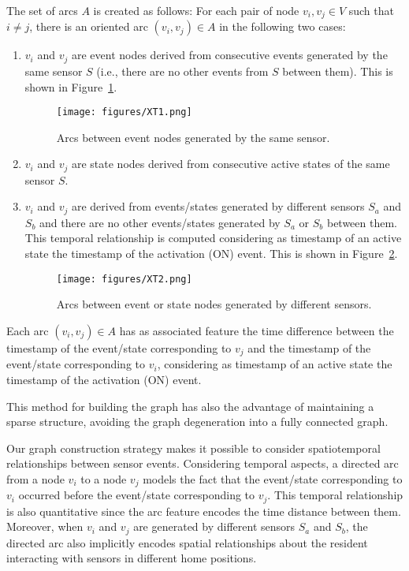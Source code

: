 The set of arcs $A$ is created as follows:
For each pair of node $v_i,v_j \in V$ such that $i \neq j$, there is an oriented arc $(v_i,v_j)\in A$ in the following two cases:
\begin{enumerate}
    \item $v_i$ and $v_j$ are event nodes derived from consecutive events generated by the same sensor $S$ (i.e., there are no other events from $S$ between them). This is shown in Figure~\ref{fig:XT1}.
    \begin{figure}
        \centering
        \texttt{[image: figures/XT1.png]}
        \caption{Arcs between event nodes generated by the same sensor.}
        \label{fig:XT1}
    \end{figure}
    \item $v_i$ and $v_j$ are state nodes derived from consecutive active states of the same sensor $S$. 
    
    \item $v_i$ and $v_j$ are derived from events/states generated by different sensors $S_a$ and $S_b$ and there are no other events/states generated by $S_a$ or $S_b$ between them. This temporal relationship is computed considering as timestamp of an active state the timestamp of the activation (ON) event. 
    This is shown in Figure~\ref{fig:XT2}.

        \begin{figure}
        \centering
        \texttt{[image: figures/XT2.png]}
        \caption{Arcs between event or state nodes generated by different sensors.}
        \label{fig:XT2}
    \end{figure}
\end{enumerate}

Each arc $(v_i,v_j)\in A$ has as associated feature the time difference between the timestamp of the event/state corresponding to $v_j$ and the timestamp of the event/state corresponding to $v_i$, considering as timestamp of an active state the timestamp of the activation (ON) event.










This method for building the graph has also the advantage of maintaining a sparse structure, avoiding the graph degeneration into a fully connected graph.

Our graph construction strategy makes it possible to consider spatiotemporal relationships between sensor events. Considering temporal aspects, a directed arc from a node $v_i$ to a node $v_j$ models the fact that the event/state corresponding to $v_i$ occurred before the event/state corresponding to $v_j$. This temporal relationship is also quantitative since the arc feature encodes the time distance between them. Moreover, when $v_i$ and $v_j$ are generated by different sensors $S_a$ and $S_b$, the directed arc also implicitly encodes spatial relationships about the resident interacting with sensors in different home positions.



